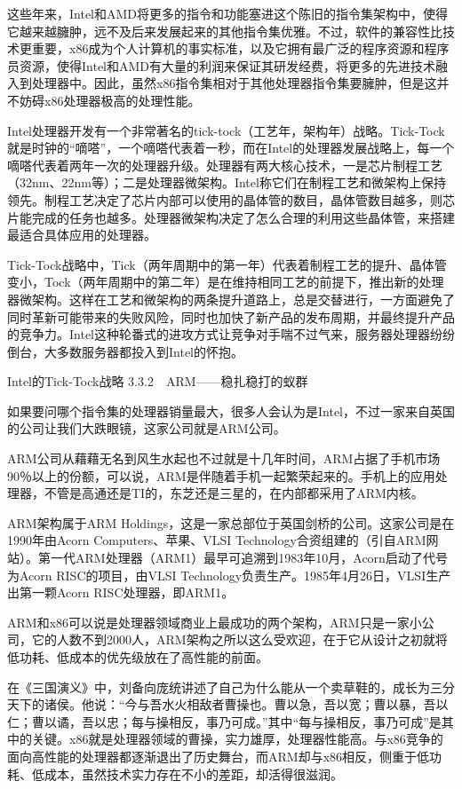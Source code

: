 \documentclass[12pt,UTF8]{ctexbook}
\begin{document}
这些年来，Intel和AMD将更多的指令和功能塞进这个陈旧的指令集架构中，使得它越来越臃肿，远不及后来发展起来的其他指令集优雅。不过，软件的兼容性比技术更重要，x86成为个人计算机的事实标准，以及它拥有最广泛的程序资源和程序员资源，使得Intel和AMD有大量的利润来保证其研发经费，将更多的先进技术融入到处理器中。因此，虽然x86指令集相对于其他处理器指令集要臃肿，但是这并不妨碍x86处理器极高的处理性能。

Intel处理器开发有一个非常著名的tick-tock（工艺年，架构年）战略。Tick-Tock就是时钟的“嘀嗒”，一个嘀嗒代表着一秒，而在Intel的处理器发展战略上，每一个嘀嗒代表着两年一次的处理器升级。处理器有两大核心技术，一是芯片制程工艺（32nm、22nm等）；二是处理器微架构。Intel称它们在制程工艺和微架构上保持领先。制程工艺决定了芯片内部可以使用的晶体管的数目，晶体管数目越多，则芯片能完成的任务也越多。处理器微架构决定了怎么合理的利用这些晶体管，来搭建最适合具体应用的处理器。

Tick-Tock战略中，Tick（两年周期中的第一年）代表着制程工艺的提升、晶体管变小，Tock（两年周期中的第二年）是在维持相同工艺的前提下，推出新的处理器微架构。这样在工艺和微架构的两条提升道路上，总是交替进行，一方面避免了同时革新可能带来的失败风险，同时也加快了新产品的发布周期，并最终提升产品的竞争力。Intel这种轮番式的进攻方式让竞争对手喘不过气来，服务器处理器纷纷倒台，大多数服务器都投入到Intel的怀抱。

Intel的Tick-Tock战略
3.3.2　ARM——稳扎稳打的蚁群

如果要问哪个指令集的处理器销量最大，很多人会认为是Intel，不过一家来自英国的公司让我们大跌眼镜，这家公司就是ARM公司。

ARM公司从藉藉无名到风生水起也不过就是十几年时间，ARM占据了手机市场90％以上的份额，可以说，ARM是伴随着手机一起繁荣起来的。手机上的应用处理器，不管是高通还是TI的，东芝还是三星的，在内部都采用了ARM内核。

ARM架构属于ARM Holdings，这是一家总部位于英国剑桥的公司。这家公司是在1990年由Acorn Computers、苹果、VLSI Technology合资组建的（引自ARM网站）。第一代ARM处理器（ARM1）最早可追溯到1983年10月，Acorn启动了代号为Acorn RISC的项目，由VLSI Technology负责生产。1985年4月26日，VLSI生产出第一颗Acorn RISC处理器，即ARM1。

ARM和x86可以说是处理器领域商业上最成功的两个架构，ARM只是一家小公司，它的人数不到2000人，ARM架构之所以这么受欢迎，在于它从设计之初就将低功耗、低成本的优先级放在了高性能的前面。

在《三国演义》中，刘备向庞统讲述了自己为什么能从一个卖草鞋的，成长为三分天下的诸侯。他说：“今与吾水火相敌者曹操也。曹以急，吾以宽；曹以暴，吾以仁；曹以谲，吾以忠；每与操相反，事乃可成。”其中“每与操相反，事乃可成”是其中的关键。x86就是处理器领域的曹操，实力雄厚，处理器性能高。与x86竞争的面向高性能的处理器都逐渐退出了历史舞台，而ARM却与x86相反，侧重于低功耗、低成本，虽然技术实力存在不小的差距，却活得很滋润。
\end{document}

